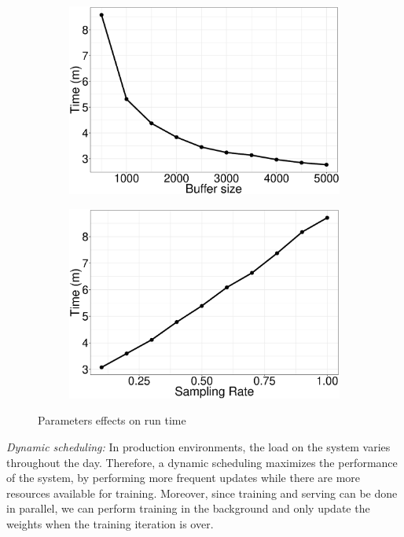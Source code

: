 \documentclass{vldb}
\begin{document}
\begin{figure}[H]
\begin{subfigure}{0.5\columnwidth}
\includegraphics[width=\columnwidth]{../images/experiment-results/movie-lens-100k-buffer-time-improved.eps}
\caption{}
\label{fig:movie-lens-100k-buffer-size-time}
\end{subfigure}%
\begin{subfigure}{0.5\columnwidth}
\includegraphics[width=\columnwidth]{../images/experiment-results/movie-lens-100k-sampling-time-improved.eps}
\caption{}
\label{fig:movie-lens-100k-sample-rate-time}
\end{subfigure}
\caption{Parameters effects on run time}
\end{figure}

\textit{Dynamic scheduling:} In production environments, the load on the system varies throughout the day. 
Therefore, a dynamic scheduling maximizes the performance of the system, by performing more frequent updates while there are more resources available for training. 
Moreover, since training and serving can be done in parallel, we can perform training in the background and only update the weights when the training iteration is over. 
\end{document}
